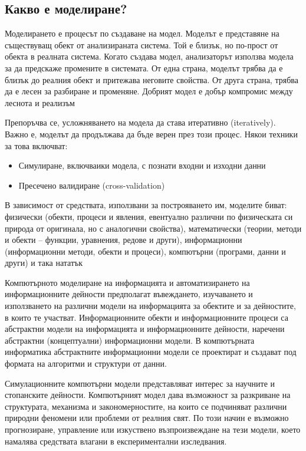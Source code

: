 	\subsection{Какво е моделиране?}
	
		Моделирането е процесът по създаване на модел. Моделът е представяне на съществуващ обект 
		от анализираната система. Той е близък, но по-прост от обекта в реалната система.
		Когато създава модел, анализаторът използва модела за да предскаже промените в системата.
		От една страна, моделът трябва да е близък до реалния обект и притежава неговите свойства.
		От друга страна, трябва да е лесен за разбиране и променяне.
		Добрият модел е добър компромис между леснота и реализъм \cite{Anu}
	
		Препоръчва се, усложняването на модела да става итеративно (iteratively). 
		Важно е, моделът да продължава да бъде верен през този процес. 		
		Някои техники за това включват:		
		
		\begin{itemize}		
			\item Симулиране, включваики модела, с познати входни и изходни данни			
			\item Пресечено валидиране (cross-validation) \cite{Mahoney}				
		\end{itemize}		 
		
		В зависимост от средствата, използвани за построяването им, моделите биват: физически
		(обекти, процеси и явления, евентуално различни по физическата си природа от оригинала,
		но с аналогични свойства), математически (теории, методи и обекти – функции, уравнения,
		редове и други), информационни (информационни методи, обекти и процеси), компютърни
		(програми, данни и други) и така нататък \cite{Totkov}
		
		Компютърното моделиране на информацията и автоматизирането на
		информационните дейности предполагат въвеждането, изучаването и използването на
		различни модели на информацията за обектите и за дейностите, в които те участват.
		Информационните обекти и информационните процеси са абстрактни модели на
		информацията и информационните дейности, наречени абстрактни (концептуални)
		информационни модели. В компютърната информатика абстрактните информационни
		модели се проектират и създават под формата на алгоритми и структури от данни. \cite{Totkov}
		
		Симулационните компютърни модели представляват интерес за научните и
		стопанските дейности. Компютърният модел дава възможност за разкриване на структурата,
		механизма и закономерностите, на които се подчиняват различни природни феномени или
		проблеми от реалния свят. По този начин е възможно прогнозиране, управление или
		изкуствено възпроизвеждане на тези модели, което намалява средствата влагани в
		експериментални изследвания. \cite{Iliev}
		
